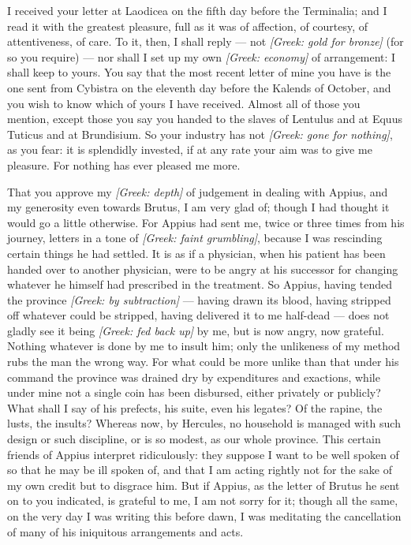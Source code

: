 

 I received your letter at Laodicea on the fifth day before the Terminalia; and I read it with the greatest pleasure, full as it was of affection, of courtesy, of attentiveness, of care. To it, then, I shall reply --- not \textit{[Greek: gold for bronze]} (for so you require) --- nor shall I set up my own \textit{[Greek: economy]} of arrangement: I shall keep to yours. You say that the most recent letter of mine you have is the one sent from Cybistra on the eleventh day before the Kalends of October, and you wish to know which of yours I have received. Almost all of those you mention, except those you say you handed to the slaves of Lentulus and at Equus Tuticus and at Brundisium. So your industry has not \textit{[Greek: gone for nothing]}, as you fear: it is splendidly invested, if at any rate your aim was to give me pleasure. For nothing has ever pleased me more.

 That you approve my \textit{[Greek: depth]} of judgement in dealing with Appius, and my generosity even towards Brutus, I am very glad of; though I had thought it would go a little otherwise. For Appius had sent me, twice or three times from his journey, letters in a tone of \textit{[Greek: faint grumbling]}, because I was rescinding certain things he had settled. It is as if a physician, when his patient has been handed over to another physician, were to be angry at his successor for changing whatever he himself had prescribed in the treatment. So Appius, having tended the province \textit{[Greek: by subtraction]} --- having drawn its blood, having stripped off whatever could be stripped, having delivered it to me half-dead --- does not gladly see it being \textit{[Greek: fed back up]} by me, but is now angry, now grateful. Nothing whatever is done by me to insult him; only the unlikeness of my method rubs the man the wrong way. For what could be more unlike than that under his command the province was drained dry by expenditures and exactions, while under mine not a single coin has been disbursed, either privately or publicly? What shall I say of his prefects, his suite, even his legates? Of the rapine, the lusts, the insults? Whereas now, by Hercules, no household is managed with such design or such discipline, or is so modest, as our whole province. This certain friends of Appius interpret ridiculously: they suppose I want to be well spoken of so that he may be ill spoken of, and that I am acting rightly not for the sake of my own credit but to disgrace him. But if Appius, as the letter of Brutus he sent on to you indicated, is grateful to me, I am not sorry for it; though all the same, on the very day I was writing this before dawn, I was meditating the cancellation of many of his iniquitous arrangements and acts.

